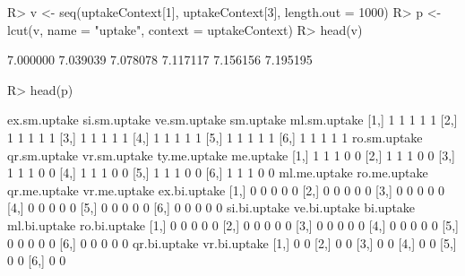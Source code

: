 \begin{Schunk}
% --begin: "pbld5"
\begin{Sinput}
R> v <- seq(uptakeContext[1], uptakeContext[3], length.out = 1000)
R> p <- lcut(v, name = "uptake", context = uptakeContext)
R> head(v)
\end{Sinput}
\begin{Soutput}
[1] 7.000000 7.039039 7.078078 7.117117 7.156156 7.195195
\end{Soutput}
\begin{Sinput}
R> head(p)
\end{Sinput}
\begin{Soutput}
     ex.sm.uptake si.sm.uptake ve.sm.uptake sm.uptake ml.sm.uptake
[1,]            1            1            1         1            1
[2,]            1            1            1         1            1
[3,]            1            1            1         1            1
[4,]            1            1            1         1            1
[5,]            1            1            1         1            1
[6,]            1            1            1         1            1
     ro.sm.uptake qr.sm.uptake vr.sm.uptake ty.me.uptake me.uptake
[1,]            1            1            1            0         0
[2,]            1            1            1            0         0
[3,]            1            1            1            0         0
[4,]            1            1            1            0         0
[5,]            1            1            1            0         0
[6,]            1            1            1            0         0
     ml.me.uptake ro.me.uptake qr.me.uptake vr.me.uptake ex.bi.uptake
[1,]            0            0            0            0            0
[2,]            0            0            0            0            0
[3,]            0            0            0            0            0
[4,]            0            0            0            0            0
[5,]            0            0            0            0            0
[6,]            0            0            0            0            0
     si.bi.uptake ve.bi.uptake bi.uptake ml.bi.uptake ro.bi.uptake
[1,]            0            0         0            0            0
[2,]            0            0         0            0            0
[3,]            0            0         0            0            0
[4,]            0            0         0            0            0
[5,]            0            0         0            0            0
[6,]            0            0         0            0            0
     qr.bi.uptake vr.bi.uptake
[1,]            0            0
[2,]            0            0
[3,]            0            0
[4,]            0            0
[5,]            0            0
[6,]            0            0
\end{Soutput}
%
% --end: "pbld5"
\end{Schunk}
